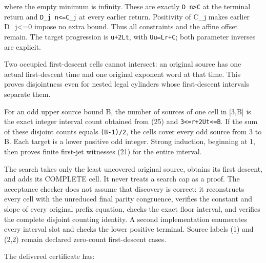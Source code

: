 
where the empty minimum is infinity. These are exactly \nolinkurl{D n>C}
at the terminal return and \nolinkurl{D_j n<=C_j} at every earlier
return. Positivity of C\_j makes earlier D\_j\textless=0 impose no extra
bound. Thus all constraints and the affine offset remain. The target
progression is \nolinkurl{u+2Lt}, with \nolinkurl{Uu=Lr+C}; both
parameter inverses are explicit.

Two occupied first-descent cells cannot intersect: an original source
has one actual first-descent time and one original exponent word at that
time. This proves disjointness even for nested legal cylinders whose
first-descent intervals separate them.

For an odd upper source bound B, the number of sources of one cell in
{[}3,B{]} is the exact integer interval count obtained from (25) and
\nolinkurl{3<=r+2Ut<=B}. If the sum of these disjoint counts equals
\nolinkurl{(B-1)/2}, the cells cover every odd source from 3 to B. Each
target is a lower positive odd integer. Strong induction, beginning at
1, then proves finite first-jet witnesses (21) for the entire interval.

The search takes only the least uncovered original source, obtains its
first descent, and adds its COMPLETE cell. It never treats a search cap
as a proof. The acceptance checker does not assume that discovery is
correct: it reconstructs every cell with the unreduced final parity
congruence, verifies the constant and slope of every original prefix
equation, checks the exact floor interval, and verifies the complete
disjoint counting identity. A second implementation enumerates every
interval slot and checks the lower positive terminal. Source labels (1)
and (2,2) remain declared zero-count first-descent cases.

The delivered certificate has:

